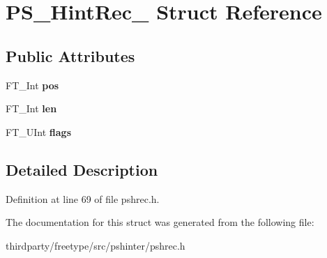 \hypertarget{struct_p_s___hint_rec__}{}\section{P\+S\+\_\+\+Hint\+Rec\+\_\+ Struct Reference}
\label{struct_p_s___hint_rec__}
\subsection*{Public Attributes}
\begin{DoxyCompactItemize}
\item 
\mbox{\label{struct_p_s___hint_rec___aa305174ac84edf8969f55503ff37bf47}} 
F\+T\+\_\+\+Int {\bfseries pos}
\item 
\mbox{\label{struct_p_s___hint_rec___a439783f07fbb601905414e5cf8e2db43}} 
F\+T\+\_\+\+Int {\bfseries len}
\item 
\mbox{\label{struct_p_s___hint_rec___a664a654ae41b4cd4c4fb387be4cad72c}} 
F\+T\+\_\+\+U\+Int {\bfseries flags}
\end{DoxyCompactItemize}


\subsection{Detailed Description}


Definition at line 69 of file pshrec.\+h.



The documentation for this struct was generated from the following file\+:\begin{DoxyCompactItemize}
\item 
thirdparty/freetype/src/pshinter/pshrec.\+h\end{DoxyCompactItemize}
